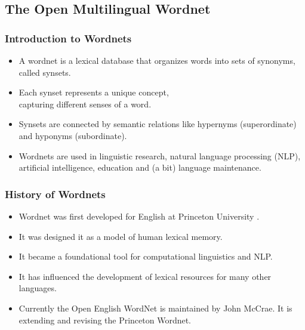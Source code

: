 \documentclass[xetex]{beamer}
\begin{document}
\subsection{The Open Multilingual Wordnet}
\begin{frame}
\frametitle{Introduction to Wordnets}

\begin{itemize}
    \item A wordnet is a lexical database that organizes words into sets of synonyms, called synsets.
    \item Each synset represents a unique concept,
      \\ capturing different senses of a word.
    \item Synsets are connected by semantic relations like hypernyms (superordinate) and hyponyms (subordinate).
    \item Wordnets are used in linguistic research, natural language processing (NLP), artificial intelligence, education and (a bit) language maintenance.
\end{itemize}
\end{frame}

\begin{frame}
\frametitle{History of Wordnets}

\begin{itemize}
\item Wordnet was first developed for English at Princeton University \citep{miller1995wordnet}.
  
    \item It was designed it as a model of human lexical memory.
    \item It became a foundational tool for computational linguistics and NLP.
    \item It has influenced the development of lexical resources for many other languages.
    \item Currently the Open English WordNet is maintained by John
      McCrae.  It is extending and revising the Princeton Wordnet.
\end{itemize}
\end{frame}
\end{document}

